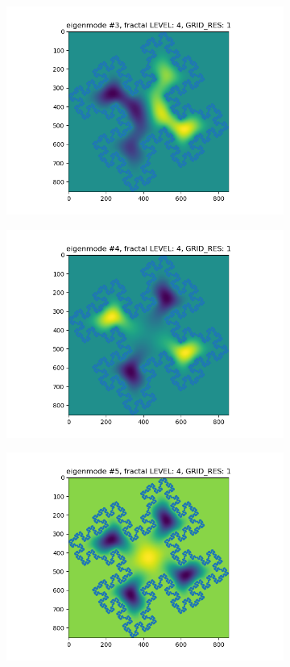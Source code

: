 \documentclass{article}
\begin{document}
\begin{figure}
\begin{subfigure}{0.3\textwidth}
        \includegraphics[width=\linewidth]{./media/eigenmode_2d3.png}
    \end{subfigure}
    \begin{subfigure}{0.3\textwidth}
        \includegraphics[width=\linewidth]{./media/eigenmode_2d4.png}
    \end{subfigure}
    \begin{subfigure}{0.3\textwidth}
        \includegraphics[width=\linewidth]{./media/eigenmode_2d5.png}

\end{subfigure}
\end{figure}
\end{document}
